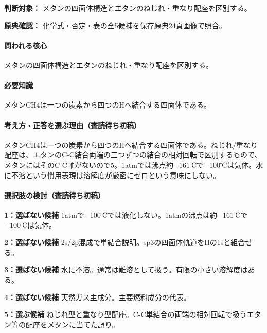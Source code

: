 \noindent\textbf{判断対象：} メタンの四面体構造とエタンのねじれ・重なり配座を区別する。\par

\noindent\textbf{原典確認：} 化学式・否定・表の全5候補を保存原典24頁画像で照合。\par

\paragraph{問われる核心} メタンの四面体構造とエタンのねじれ・重なり配座を区別する。

\paragraph{必要知識} メタンCH4は一つの炭素から四つのHへ結合する四面体である。

\paragraph{考え方・正答を選ぶ理由（査読待ち初稿）} メタンCH4は一つの炭素から四つのHへ結合する四面体である。ねじれ/重なり配座は、エタンのC-C結合両端の三つずつの結合の相対回転で区別するもので、メタンにはそのC-C軸がないので5。1atmでは沸点約−161℃で−100℃は気体。水に不溶という慣用表現は溶解度が厳密にゼロという意味にしない。

\paragraph{選択肢の検討（査読待ち初稿）}\mbox{}\par

\noindent\textbf{1：選ばない候補} 1atmで−100℃では液化しない。1atmの沸点は約−161℃で−100℃は気体。\par

\noindent\textbf{2：選ばない候補} 2s/2p混成で単結合説明。sp3の四面体軌道をHの1sと組合せる。\par

\noindent\textbf{3：選ばない候補} 水に不溶。通常は難溶として扱う。有限の小さい溶解度はある。\par

\noindent\textbf{4：選ばない候補} 天然ガス主成分。主要燃料成分の代表。\par

\noindent\textbf{5：選ぶ候補} ねじれ型と重なり型配座。C-C単結合の両端の相対回転で扱うエタン等の配座をメタンに当てた誤り。\par

